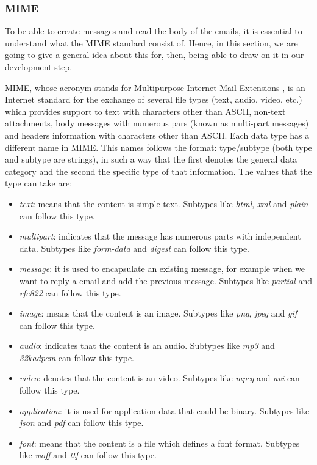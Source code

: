 \subsubsection{MIME} \label{sssect:mime}
To be able to create messages and read the body of the emails, it is essential to understand what the MIME standard consist of. Hence, in this section, we are going to give a general idea about this for, then, being able to draw on it in our development step.

MIME, whose acronym stands for Multipurpose Internet Mail Extensions \citep{wikimime, rfc2045}, is an Internet standard for the exchange of several file types (text, audio, video, etc.) which provides support to text with characters other than ASCII, non-text attachments, body messages with numerous pars (known as multi-part messages) and headers information with characters other than ASCII. Each data type has a different name in MIME. This names follows the format: type/subtype (both type and subtype are strings), in such a way that the first denotes the general data category and the second the specific type of that information. The values that the type can take are:

\begin{itemize}
	\item\textit{text}: means that the content is simple text. Subtypes like \textit{html}, \textit{xml} and \textit{plain} can follow this type.
	\item\textit{multipart}: indicates that the message has numerous parts with independent data. Subtypes like \textit{form-data} and \textit{digest} can follow this type.
	\item\textit{message}: it is used to encapsulate an existing message, for example when we want to reply a email and add the previous message. Subtypes like \textit{partial} and \textit{rfc822} can follow this type.
	\item\textit{image}: means that the content is an image. Subtypes like \textit{png}, \textit{jpeg} and \textit{gif} can follow this type.
	\item\textit{audio}: indicates that the content is an audio. Subtypes like \textit{mp3} and \textit{32kadpcm} can follow this type.
	\item\textit{video}: denotes that the content is an video. Subtypes like \textit{mpeg} and \textit{avi} can follow this type.
	\item\textit{application}: it is used for application data that could be binary. Subtypes like \textit{json} and \textit{pdf} can follow this type.
	\item\textit{font}: means that the content is a file which defines a font format. Subtypes like \textit{woff} and \textit{ttf} can follow this type.
\end{itemize}

